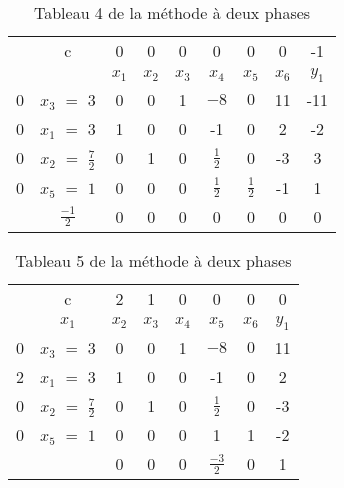 \begin{table}
\centering
\begin{tabular}{|c|c|c|c|c|c|c|c|c|}
	\hline
      & c & 0 & 0 & 0 & 0 & 0 & 0 & -1 \\ 
      \cline{2-9}
       &  & $x_{1}$ & $x_{2}$  & $x_{3}$  & $x_{4}$ & $x_{5}$ & $x_{6}$ & $y_{1}$ \\
       \hline
   0 & $x_{3}$  $=$ $3$ & 0 & 0 & 1 & $-8$ & $0$ & 11 & -11 \\
      \hline
	0 & $x_{1}$ $=$ 3 & 1 & 0 & 0 & -1 & 0 & 2 & -2 \\
	  \hline
	0 & $x_{2}$ $=$ $\frac{7}{2}$  & 0 & 1 & 0 & $\frac{1}{2}$ & 0 & -3 & 3\\
	  \hline
	0 & $x_{5}$ $=$ $1$  & 0 & 0 & 0 & $\frac{1}{2}$ & $\frac{1}{2}$ & -1 & 1\\
	  \hline
	 & $\frac{-1}{2}$ & 0 & 0 & 0 & 0 & 0 & 0 & 0\\
	  \hline
	\end{tabular}
\caption{Tableau 4 de la méthode à deux phases}
\end{table}
\begin{table}
\centering

\begin{tabular}{|c|c|c|c|c|c|c|c|}
	\hline
      & c & 2 & 1 & 0 & 0 & 0 & 0  \\ 
    \cline{2-9}	
       & $x_{1}$ & $x_{2}$ & $x_{3}$  & $x_{4}$ & $x_{5}$ & $x_{6}$ & $y_{1}$ \\
       \hline
   0 & $x_{3}$  $=$ $3$ & 0 & 0 & 1 & $-8$ & $0$ & 11 \\
      \hline
	2 & $x_{1}$ $=$ 3 & 1 & 0 & 0 & -1 & 0 & 2  \\
	  \hline
	0 & $x_{2}$ $=$ $\frac{7}{2}$  & 0 & 1 & 0 & $\frac{1}{2}$ & 0 & -3 \\
	  \hline
	0 & $x_{5}$ $=$ $1$  & 0 & 0 & 0 & 1 & 1 & -2 \\
	  \hline
	 &  & 0 & 0 & 0 & $\frac{-3}{2}$ & 0 & 1 \\
	  \hline
	\end{tabular}
\caption {Tableau 5 de la méthode à deux phases}
\end{table}

